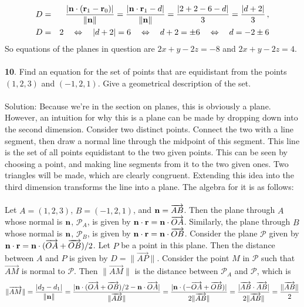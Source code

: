 \documentclass[12pt]{amsbook}
\begin{document}
\begin{eqnarray*}
D &=&\frac{|{\bf n}\cdot({\bf r}_1-{\bf r}_0)|}{\|{\bf n}\|} =
\frac{|{\bf n}\cdot{\bf r}_1-d|}{\|{\bf n}\|}=
\frac{|2+2-6-d|}{3}=\frac{|d+2|}{3}\,,\\
D&=&2\quad\Leftrightarrow\quad |d+2|=6\quad\Leftrightarrow\quad 
d+2=\pm 6\quad\Leftrightarrow\quad d=-2\pm 6
\end{eqnarray*}
So equations of the planes in question are 
$2x+y-2z=-8$ and $2x+y-2z=4$.\\
\\
{\small\bf 10}. Find an equation for the set of points that are
equidistant from the points $(1,2,3)$ and $(-1,2,1)$. Give a
geometrical description  of the set.\\
\\
{\sc Solution}: Because we're in the section on planes, this is obviously a plane. However, an intuition for why this is a plane can be made by dropping down into the second dimension. Consider two distinct points. Connect the two with a line segment, then draw a normal line through the midpoint of this segment. This line is the set of all points equidistant to the two given points. This can be seen by choosing a point, and making line segments from it to the two given ones. Two triangles will be made, which are clearly congruent. Extending this idea into the third dimension transforms the line into a plane. The algebra for it is as follows:
\\
\\
Let $A=(1,2,3)$, $B=(-1,2,1)$, and ${\bf n}=\overrightarrow{AB}$. Then the plane through $A$ whose normal is $\bf n$, $\mathcal{P}_A$, is given by ${\bf n}\cdot{\bf r}={\bf n}\cdot\overrightarrow{OA}$. Similarly, the plane through $B$ whose normal is $\bf n$, $\mathcal{P}_B$, is given by ${\bf n}\cdot{\bf r}={\bf n}\cdot\overrightarrow{OB}$. Consider the plane $\mathcal{P}$ given by ${\bf n}\cdot{\bf r}={\bf n}\cdot(\overrightarrow{OA}+\overrightarrow{OB})/2$. Let $P$ be a point in this plane. Then the distance between $A$ and $P$ is given by $D=\|\overrightarrow{AP}\|$. Consider the point $M$ in $\mathcal{P}$ such that $\overrightarrow{AM}$ is normal to $\mathcal{P}$. Then $\|\overrightarrow{AM}\|$ is the distance between $\mathcal{P}_A$ and $\mathcal{P}$, which is 
$$\|\overrightarrow{AM}\|=\frac{|d_2-d_1|}{\|{\bf n}\|}=\frac{|{\bf n}\cdot(\overrightarrow{OA}+\overrightarrow{OB})/2-{\bf n}\cdot\overrightarrow{OA}|}{\|\overrightarrow{AB}\|}=\frac{|{\bf n}\cdot(-\overrightarrow{OA}+\overrightarrow{OB})|}{2\|\overrightarrow{AB}\|}=\frac{|\overrightarrow{AB}\cdot\overrightarrow{AB}|}{2\|\overrightarrow{AB}\|}=\frac{\|\overrightarrow{AB}\|}{2}$$
\end{document}
